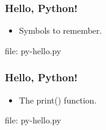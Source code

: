 
\begin{frame}[fragile]
\frametitle{Hello, Python!}
\newcommand{\newfilename}{py-hello.py}
\begin{itemize}
\item Symbols to remember.

\end{itemize}
file: \newfilename
\end{frame}

\begin{frame}[fragile]
\frametitle{Hello, Python!}
\newcommand{\newfilename}{py-hello.py}
\begin{itemize}
\item The print() function.

\end{itemize}
file: \newfilename
\end{frame}